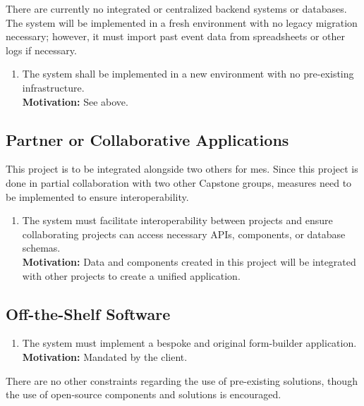 \documentclass[12pt]{article}
\begin{document}
There are currently no integrated or centralized backend systems or databases. The system will be implemented in a
fresh environment with no legacy migration necessary; however, it must import past event data from spreadsheets or
other logs if necessary.

\begin{enumerate}[align=left,
  leftmargin=*,
  labelsep=1em,
  itemindent=0em,
  label=\bfseries IEC-\arabic*:]
  \item The system shall be implemented in a new environment with no pre-existing infrastructure.\\[2mm]
    {\bf Motivation:} See above.
\end{enumerate}

\subsection{Partner or Collaborative Applications}
This project is to be integrated alongside two others for \gls{mes}. Since this project is done in partial
collaboration with two other Capstone groups, measures need to be implemented to ensure interoperability.

\begin{enumerate}[align=left,
  leftmargin=*,
  labelsep=1em,
  itemindent=0em,
  label=\bfseries PCC-\arabic*:]
  \item The system must facilitate interoperability between projects and ensure collaborating projects can access
    necessary APIs, components, or database schemas.\\[2mm]
    {\bf Motivation:} Data and components created in this project will be integrated with other projects to
    create a unified application.
\end{enumerate}

\subsection{Off-the-Shelf Software}
\begin{enumerate}[align=left,
  leftmargin=*,
  labelsep=1em,
  itemindent=0em,
  label=\bfseries OSC-\arabic*:]
  \item The system must implement a bespoke and original form-builder application.\\[2mm]
    {\bf Motivation:} Mandated by the client.
\end{enumerate}

There are no other constraints regarding the use of pre-existing solutions, though the use of open-source components and
solutions is encouraged.
\end{document}
